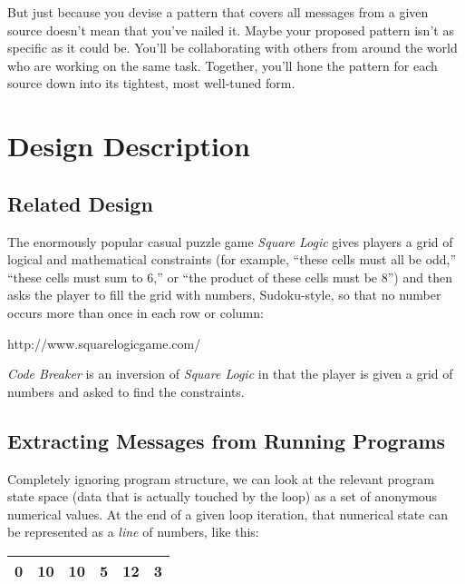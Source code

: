 \documentclass[12pt]{article}
\begin{document}
But just because you devise a pattern that covers all messages from a given source doesn't mean that you've nailed it.  Maybe your proposed pattern isn't as specific as it could be.  You'll be collaborating with others from around the world who are working on the same task.  Together, you'll hone the pattern for each source down into its tightest, most well-tuned form.

\section{Design Description}

\subsection{Related Design}

The enormously popular casual puzzle game {\it Square Logic} gives players a grid of logical and mathematical constraints (for example, ``these cells must all be odd,'' ``these cells must sum to 6,'' or ``the product of these cells must be 8'') and then asks the player to fill the grid with numbers, Sudoku-style, so that no number occurs more than once in each row or column:

\begin{center}
http://www.squarelogicgame.com/
\end{center}

{\it Code Breaker} is an inversion of {\it Square Logic} in that the player is given a grid of numbers and asked to find the constraints.


\subsection{Extracting Messages from Running Programs}

Completely ignoring program structure, we can look at the relevant program state space (data that is actually touched by the loop) as a set of anonymous numerical values.  At the end of a given loop iteration, that numerical state can be represented as a {\it line} of numbers, like this:


\begin{center}
\begin{tabular}{|r|r|r|r|r|r|}
\hline

0&10&10&5&12&3\\
\hline
\end{tabular}
\end{center}
\end{document}
